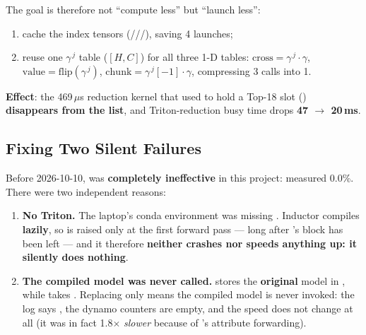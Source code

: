 The goal is therefore not ``compute less'' but ``launch less'':

\begin{enumerate}
\item cache the index tensors (///), saving 4
      launches;
\item reuse one $\gamma^{\,j}$ table ($[H,C]$) for all three 1-D tables:
      $\text{cross} = \gamma^{\,j} \cdot \gamma$,
      $\text{value} = \text{flip}(\gamma^{\,j})$,
      $\text{chunk} = \gamma^{\,j}[-1] \cdot \gamma$, compressing 3  calls into 1.
\end{enumerate}

\textbf{Effect}: the 469\,$\mu$s reduction kernel that used to hold a Top-18 slot
()
\textbf{disappears from the list}, and Triton-reduction busy time drops \textbf{47 $\rightarrow$
20\,ms}.

\subsection{Fixing Two Silent  Failures}
\label{sec:en-eng-compile}

Before 2026-10-10,  was \textbf{completely ineffective} in this project:
measured 0.0\%. There were two independent reasons:

\begin{enumerate}
\item \textbf{No Triton.} The laptop's conda environment was missing .
      Inductor compiles \textbf{lazily}, so  is raised only at the first
      forward pass --- long after 's  block has been left --- and it
      therefore \textbf{neither crashes nor speeds anything up: it silently does nothing}.
\item \textbf{The compiled model was never called.}  stores the
      \textbf{original} model in , while  takes
      . Replacing only 
      means the compiled model is never invoked: the log says
      , the dynamo counters are empty, and the speed does not
      change at all (it was in fact 1.8$\times$ \emph{slower} because of
      's attribute forwarding).
\end{enumerate}

